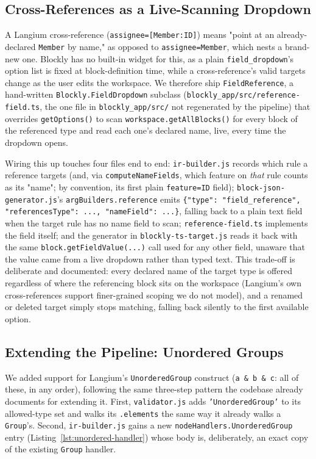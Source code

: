 \documentclass[runningheads]{llncs}
\begin{document}
\subsection{Cross-References as a Live-Scanning Dropdown}
\label{sec:crossref}
A Langium cross-reference (\texttt{assignee=[Member:ID]}) means "point at an already-declared \texttt{Member} by name," as opposed to \texttt{assignee=Member}, which nests a brand-new one. Blockly has no built-in widget for this, as a plain \texttt{field\_dropdown}'s option list is fixed at block-definition time, while a cross-reference's valid targets change as the user edits the workspace. We therefore ship \texttt{FieldReference}, a hand-written \texttt{Blockly.\allowbreak FieldDropdown} subclass (\texttt{blockly\_app\slash src\slash reference-\allowbreak field.ts}, the one file in \texttt{blockly\_app\slash src\slash} not regenerated by the pipeline) that overrides \texttt{getOptions()} to scan \texttt{workspace.getAllBlocks()} for every block of the referenced type and read each one's declared name, live, every time the dropdown opens.

Wiring this up touches four files end to end: \texttt{ir-\allowbreak builder.js} records which rule a reference targets (and, via \texttt{computeNameFields}, which feature on \emph{that} rule counts as its "name"; by convention, its first plain \texttt{feature=ID} field); \texttt{block-\allowbreak json-\allowbreak generator.js}'s \texttt{argBuilders.\allowbreak reference} emits \texttt{\{"type": "field\_reference", "referencesType": ..., "nameField": ...\}}, falling back to a plain text field when the target rule has no name field to scan; \texttt{reference-field.ts} implements the field itself; and the generator in \texttt{blockly-ts-target.js} reads it back with the same \texttt{block.getFieldValue(...)} call used for any other field, unaware that the value came from a live dropdown rather than typed text. This trade-off is deliberate and documented: every declared name of the target type is offered regardless of where the referencing block sits on the workspace (Langium's own cross-references support finer-grained scoping we do not model), and a renamed or deleted target simply stops matching, falling back silently to the first available option.

\subsection{Extending the Pipeline: Unordered Groups}
\label{sec:unordered}
We added support for Langium's \texttt{UnorderedGroup} construct (\texttt{a \& b \& c}: all of these, in any order), following the same three-step pattern the codebase already documents for extending it. First, \texttt{validator.js} adds \texttt{'UnorderedGroup'} to its allowed-type set and walks its \texttt{.elements} the same way it already walks a \texttt{Group}'s. Second, \texttt{ir-builder.js} gains a new \texttt{nodeHandlers.UnorderedGroup} entry (Listing~\ref{lst:unordered-handler}) whose body is, deliberately, an exact copy of the existing \texttt{Group} handler.
\end{document}
